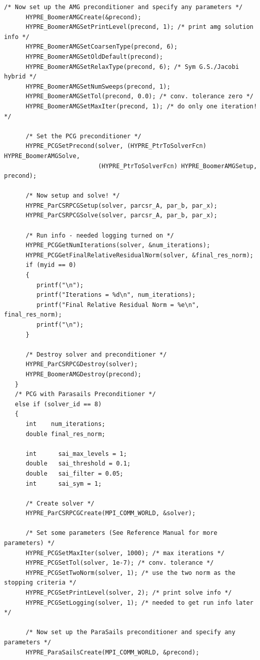 \documentclass[a4paper,10pt]{article}
\numberwithin{figure}{section}
\numberwithin{table}{section}
\begin{document}
\begin{lstlisting}[frame=single, breaklines=true]
      /* Now set up the AMG preconditioner and specify any parameters */
      HYPRE_BoomerAMGCreate(&precond);
      HYPRE_BoomerAMGSetPrintLevel(precond, 1); /* print amg solution info */
      HYPRE_BoomerAMGSetCoarsenType(precond, 6);
      HYPRE_BoomerAMGSetOldDefault(precond);
      HYPRE_BoomerAMGSetRelaxType(precond, 6); /* Sym G.S./Jacobi hybrid */
      HYPRE_BoomerAMGSetNumSweeps(precond, 1);
      HYPRE_BoomerAMGSetTol(precond, 0.0); /* conv. tolerance zero */
      HYPRE_BoomerAMGSetMaxIter(precond, 1); /* do only one iteration! */

      /* Set the PCG preconditioner */
      HYPRE_PCGSetPrecond(solver, (HYPRE_PtrToSolverFcn) HYPRE_BoomerAMGSolve,
                          (HYPRE_PtrToSolverFcn) HYPRE_BoomerAMGSetup, precond);

      /* Now setup and solve! */
      HYPRE_ParCSRPCGSetup(solver, parcsr_A, par_b, par_x);
      HYPRE_ParCSRPCGSolve(solver, parcsr_A, par_b, par_x);

      /* Run info - needed logging turned on */
      HYPRE_PCGGetNumIterations(solver, &num_iterations);
      HYPRE_PCGGetFinalRelativeResidualNorm(solver, &final_res_norm);
      if (myid == 0)
      {
         printf("\n");
         printf("Iterations = %d\n", num_iterations);
         printf("Final Relative Residual Norm = %e\n", final_res_norm);
         printf("\n");
      }

      /* Destroy solver and preconditioner */
      HYPRE_ParCSRPCGDestroy(solver);
      HYPRE_BoomerAMGDestroy(precond);
   }
   /* PCG with Parasails Preconditioner */
   else if (solver_id == 8)
   {
      int    num_iterations;
      double final_res_norm;

      int      sai_max_levels = 1;
      double   sai_threshold = 0.1;
      double   sai_filter = 0.05;
      int      sai_sym = 1;

      /* Create solver */
      HYPRE_ParCSRPCGCreate(MPI_COMM_WORLD, &solver);

      /* Set some parameters (See Reference Manual for more parameters) */
      HYPRE_PCGSetMaxIter(solver, 1000); /* max iterations */
      HYPRE_PCGSetTol(solver, 1e-7); /* conv. tolerance */
      HYPRE_PCGSetTwoNorm(solver, 1); /* use the two norm as the stopping criteria */
      HYPRE_PCGSetPrintLevel(solver, 2); /* print solve info */
      HYPRE_PCGSetLogging(solver, 1); /* needed to get run info later */

      /* Now set up the ParaSails preconditioner and specify any parameters */
      HYPRE_ParaSailsCreate(MPI_COMM_WORLD, &precond);


\end{lstlisting}
\end{document}
